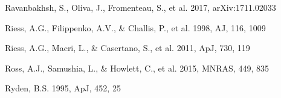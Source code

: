 \documentclass[twocolumn]{aastex61}
\begin{document}
\begin{thebibliography}{}





Ravanbakhsh, S., Oliva, J., Fromenteau, S., et al. 2017, arXiv:1711.02033

Riess, A.G., Filippenko, A.V., \& Challis, P., et al. 1998, AJ, 116, 1009  

Riess, A.G., Macri, L., \& Casertano, S., et al. 2011, ApJ, 730, 119


Ross, A.J., Samushia, L., \& Howlett, C., et al. 2015, MNRAS, 449, 835

Ryden, B.S. 1995, ApJ, 452, 25  











\end{thebibliography}
\end{document}

